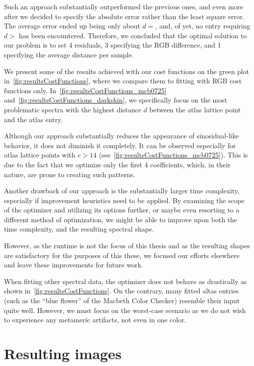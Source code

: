 Such an approach substantially outperformed the previous ones, and even more after we decided to specify the absolute error rather than the least square error. The average error ended up being only about $d = $, and, of yet, no entry requiring $d > $ has been encountered. Therefore, we concluded that the optimal solution to our problem is to set 4 residuals, 3 specifying the RGB difference, and 1 specifying the average distance per sample.

We present some of the results achieved with our cost functions on the green plot in~\cref{fig:resultsCostFunctions}, where we compare them to fitting with RGB cost functions only. In~\cref{fig:resultsCostFunctions_mcb0725} and~\cref{fig:resultsCostFunctions_darkskin}, we specifically focus on the most problematic spectra with the highest distance $d$ between the atlas lattice point and the atlas entry.

Although our approach substantially reduces the appearance of sinosidual-like behavior, it does not diminish it completely. It can be observed especially for atlas lattice points with $c > 14$ (see~\cref{fig:resultsCostFunctions_mcb0725}). This is due to the fact that we optimize only the first 4 coefficients, which, in their nature, are prone to creating such patterns.

Another drawback of our approach is the substantially larger time complexity, especially if improvement heuristics need to be applied. By examining the scope of the optimizer and utilizing its options further, or maybe even resorting to a different method of optimization, we might be able to improve upon both the time complexity, and the resulting spectral shape.

However, as the runtime is not the focus of this thesis and as the resulting shapes are satisfactory for the purposes of this these, we focused our efforts elsewhere and leave these improvements for future work.

When fitting other spectral data, the optimizer does not behave as drastically as shown in~\cref{fig:resultsCostFunctions}. On the contrary, many fitted altas entries (such as the ``blue flower'' of the Macbeth Color Checker) resemble their input quite well. However, we must focus on the worst-case scenario as we do not wish to experience any metameric artifacts, not even in one color.

\section{Resulting images}

